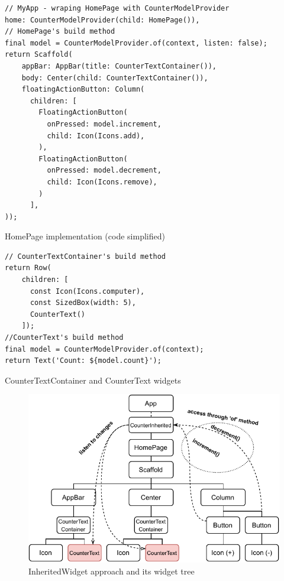 \begin{listing}[ht]
\begin{verbatim}
// MyApp - wraping HomePage with CounterModelProvider
home: CounterModelProvider(child: HomePage()),
// HomePage's build method
final model = CounterModelProvider.of(context, listen: false);
return Scaffold(
    appBar: AppBar(title: CounterTextContainer()),
    body: Center(child: CounterTextContainer()),
    floatingActionButton: Column(
      children: [
        FloatingActionButton(
          onPressed: model.increment,
          child: Icon(Icons.add),
        ),
        FloatingActionButton(
          onPressed: model.decrement,
          child: Icon(Icons.remove),
        )
      ],
));
\end{verbatim}
\caption{HomePage implementation (code simplified)}
\label{listing:counter-inherited-homepage}
\end{listing}

\begin{listing}[ht]
\begin{verbatim}
// CounterTextContainer's build method
return Row(
    children: [
      const Icon(Icons.computer),
      const SizedBox(width: 5),
      CounterText()
    ]);
//CounterText's build method
final model = CounterModelProvider.of(context);
return Text('Count: ${model.count}');
\end{verbatim}
\caption{CounterTextContainer and CounterText widgets}
\label{listing:counter-inherited-text-container}
\end{listing}

\begin{figure}[htp]
    \centering
    \includegraphics[width=0.75\linewidth]{img/flutter/counter-inherited-widget.pdf}
    \caption{InheritedWidget approach and its widget tree}
    \label{fig:counter-app-inherited-widget}
\end{figure}

